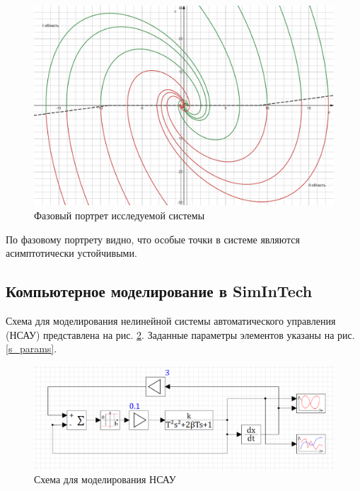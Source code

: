 	
	\begin{figure}[h]
		\centering\includegraphics[width=\textwidth]{png/ФП_системы.png}
		\caption{Фазовый портрет исследуемой системы}
		\label{FP}
	\end{figure}
	
	
	По фазовому портрету видно, что особые точки в системе являются асимптотически устойчивыми.
	
	\subsection[Компьютерное моделирование]{Компьютерное моделирование в SimInTech}
	
	Схема для моделирования нелинейной системы автоматического управления (НСАУ) представлена на рис. \ref{s_scheme}. Заданные параметры элементов указаны на рис. \ref{s_params}.
	
	
	\begin{figure}[h]
		\centering\includegraphics[width=.7\textwidth]{png/Схема_simintech.png}
		\caption{Схема для моделирования НСАУ}
		\label{s_scheme}
	\end{figure}
	
